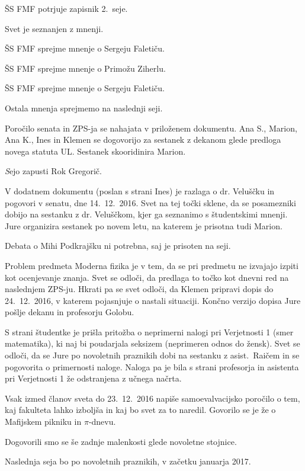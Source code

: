\documentclass{seja}
\begin{document}
\begin{ad}
\item
\begin{sklep*}
  ŠS FMF potrjuje zapisnik 2.~seje.
\end{sklep*}

\item
Svet je seznanjen z mnenji.

\begin{sklep*} ŠS FMF sprejme mnenje o Sergeju Faletiču. \end{sklep*}
\begin{sklep*} ŠS FMF sprejme mnenje o Primožu Ziherlu. \end{sklep*}
\begin{sklep*} ŠS FMF sprejme mnenje o Sergeju Faletiču. \end{sklep*}

Ostala mnenja sprejmemo na naslednji seji.

\item
Poročilo senata in ZPS-ja se nahajata v priloženem dokumentu.
Ana S., Marion, Ana K., Ines in Klemen se dogovorijo za sestanek z dekanom glede
predloga novega statuta UL. Sestanek skooridinira Marion.

\textit Sejo zapusti Rok Gregorič.

\item
V dodatnem dokumentu (poslan s strani Ines) je razlaga o dr. Veluščku in
pogovori v senatu, dne 14.~12.~2016.  Svet na tej točki sklene, da se
posamezniki dobijo na sestanku z dr. Veluščkom, kjer ga seznanimo s študentskimi
mnenji. Jure organizira sestanek po novem letu, na katerem je prisotna tudi
Marion.

\item
Debata o Mihi Podkrajšku ni potrebna, saj je prisoten na seji.

\item
Problem predmeta Moderna fizika je v tem, da se pri predmetu ne izvajajo izpiti
kot ocenjevanje znanja.  Svet se odloči, da predlaga to točko kot dnevni red na
naslednjem ZPS-ju. Hkrati pa se svet odloči, da Klemen pripravi dopis do
24.~12.~2016, v katerem pojasnjuje o nastali situaciji. Končno verzijo dopisa
Jure pošlje dekanu in profesorju Golobu.

\item
S strani študentke je prišla pritožba o neprimerni nalogi pri Verjetnosti 1
(smer matematika), ki naj bi poudarjala seksizem (neprimeren odnos do žensk).
Svet se odloči, da se Jure po novoletnih praznikih dobi na sestanku z
asist.~Raičem in se pogovorita o primernosti naloge.  Naloga pa je bila s strani
profesorja in asistenta pri Verjetnosti 1 že odstranjena z učnega načrta.

\item
Vsak izmed članov sveta do 23.~12.~2016 napiše samoevalvacijsko poročilo o tem,
kaj fakulteta lahko izboljša in kaj bo svet za to naredil. Govorilo se je že o
Mafijskem pikniku in $\pi$-dnevu.

Dogovorili smo se še zadnje malenkosti glede novoletne stojnice.

Naslednja seja bo po novoletnih praznikih, v začetku januarja 2017.
\end{ad}
\end{document}
